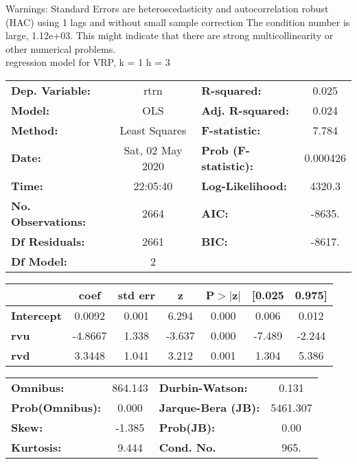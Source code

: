 Warnings: \newline
 [1] Standard Errors are heteroscedasticity and autocorrelation robust (HAC) using 1 lags and without small sample correction \newline
 [2] The condition number is large, 1.12e+03. This might indicate that there are \newline
 strong multicollinearity or other numerical problems.\\ 

regression model for VRP, k = 1 h = 3\begin{center}
\begin{tabular}{lclc}
\toprule
\textbf{Dep. Variable:}    &       rtrn       & \textbf{  R-squared:         } &     0.025   \\
\textbf{Model:}            &       OLS        & \textbf{  Adj. R-squared:    } &     0.024   \\
\textbf{Method:}           &  Least Squares   & \textbf{  F-statistic:       } &     7.784   \\
\textbf{Date:}             & Sat, 02 May 2020 & \textbf{  Prob (F-statistic):} &  0.000426   \\
\textbf{Time:}             &     22:05:40     & \textbf{  Log-Likelihood:    } &    4320.3   \\
\textbf{No. Observations:} &        2664      & \textbf{  AIC:               } &    -8635.   \\
\textbf{Df Residuals:}     &        2661      & \textbf{  BIC:               } &    -8617.   \\
\textbf{Df Model:}         &           2      & \textbf{                     } &             \\
\bottomrule
\end{tabular}
\begin{tabular}{lcccccc}
                   & \textbf{coef} & \textbf{std err} & \textbf{z} & \textbf{P$> |$z$|$} & \textbf{[0.025} & \textbf{0.975]}  \\
\midrule
\textbf{Intercept} &       0.0092  &        0.001     &     6.294  &         0.000        &        0.006    &        0.012     \\
\textbf{rvu}       &      -4.8667  &        1.338     &    -3.637  &         0.000        &       -7.489    &       -2.244     \\
\textbf{rvd}       &       3.3448  &        1.041     &     3.212  &         0.001        &        1.304    &        5.386     \\
\bottomrule
\end{tabular}
\begin{tabular}{lclc}
\textbf{Omnibus:}       & 864.143 & \textbf{  Durbin-Watson:     } &    0.131  \\
\textbf{Prob(Omnibus):} &   0.000 & \textbf{  Jarque-Bera (JB):  } & 5461.307  \\
\textbf{Skew:}          &  -1.385 & \textbf{  Prob(JB):          } &     0.00  \\
\textbf{Kurtosis:}      &   9.444 & \textbf{  Cond. No.          } &     965.  \\
\bottomrule
\end{tabular}
\end{center}

